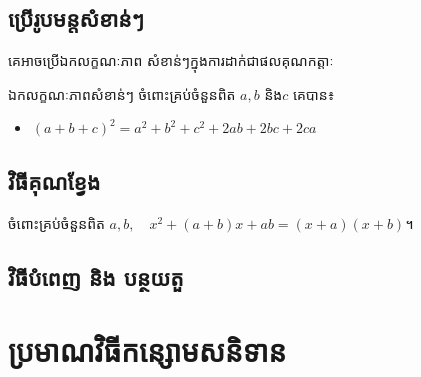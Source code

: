 \subsection{ប្រើរូបមន្តសំខាន់ៗ}
គេអាចប្រើឯកលក្ខណៈភាព សំខាន់ៗក្នុងការដាក់ជាផលគុណកត្តាៈ
\begin{propertyT}{ឯកលក្ខណៈភាពសំខាន់ៗ}
ចំពោះគ្រប់ចំនួនពិត $a,b$ និង$c$ គេបាន៖
\begin{itemize}
\item $(a+b+c)^2=a^2+b^2+c^2+2ab+2bc+2ca$
\end{itemize}
\end{propertyT}
\subsection{វិធីគុណខ្វែង}
\begin{generalT}
ចំពោះគ្រប់ចំនួនពិត $a,b, \quad x^2+(a+b)x+ab=(x+a)(x+b)$។
\end{generalT}
\subsection{វិធីបំពេញ និង បន្ថយតួ}
\section{ប្រមាណវិធីកន្សោមសនិទាន}

